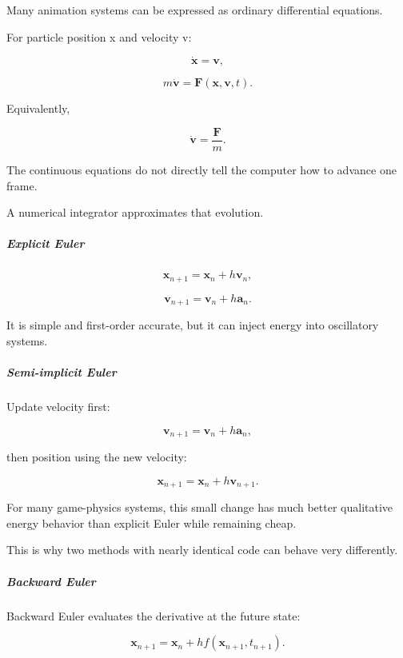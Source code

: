 \hypertarget{03-visual-computing-i-ch001-animation-turns-the-world-into-an-ode-problem}{}

Many animation systems can be expressed as ordinary differential equations.

For particle position x and velocity v:

\[
\dot{\mathbf x}=\mathbf v,
\]

\[
m\dot{\mathbf v}=\mathbf F(\mathbf x,\mathbf v,t).
\]

Equivalently,

\[
\dot{\mathbf v}
=
\frac{\mathbf F}{m}.
\]

The continuous equations do not directly tell the computer how to advance one frame.

A numerical integrator approximates that evolution.

\subparagraph{Explicit Euler}\label{03-visual-computing-i-ch001-explicit-euler}

\hypertarget{03-visual-computing-i-ch001-explicit-euler}{}

\[
\mathbf x_{n+1}
=
\mathbf x_n+h\mathbf v_n,
\]

\[
\mathbf v_{n+1}
=
\mathbf v_n+h\mathbf a_n.
\]

It is simple and first-order accurate, but it can inject energy into oscillatory systems.

\subparagraph{Semi-implicit Euler}\label{03-visual-computing-i-ch001-semi-implicit-euler}

\hypertarget{03-visual-computing-i-ch001-semi-implicit-euler}{}

Update velocity first:

\[
\mathbf v_{n+1}
=
\mathbf v_n+h\mathbf a_n,
\]

then position using the new velocity:

\[
\mathbf x_{n+1}
=
\mathbf x_n+h\mathbf v_{n+1}.
\]

For many game-physics systems, this small change has much better qualitative energy behavior than explicit Euler while remaining cheap.

This is why two methods with nearly identical code can behave very differently.

\subparagraph{Backward Euler}\label{03-visual-computing-i-ch001-backward-euler}

\hypertarget{03-visual-computing-i-ch001-backward-euler}{}

Backward Euler evaluates the derivative at the future state:

\[
\mathbf x_{n+1}
=
\mathbf x_n
+
h f(\mathbf x_{n+1},t_{n+1}).
\]


